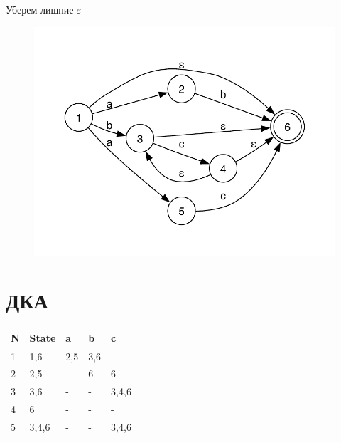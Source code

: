 \documentclass[12pt,onecolumn]{article}
\begin{document}
Уберем лишние $\varepsilon$\\

\begin{figure}[H]
    \centering
    \includegraphics[width=\textwidth]{abcc.pdf}
\end{figure}

\section*{ДКА}

\begin{table}[H]
    \begin{tabular}{|l|l|l|l|l|}
    \hline
    N & State & a   & b   & c     \\ \hline
    1 & 1,6   & 2,5 & 3,6 & -     \\ \hline
    2 & 2,5   & -   & 6   & 6     \\ \hline
    3 & 3,6   & -   & -   & 3,4,6 \\ \hline
    4 & 6     & -   & -   & -     \\ \hline
    5 & 3,4,6 & -   & -   & 3,4,6 \\ \hline
    \end{tabular}
\end{table}

\end{document}
